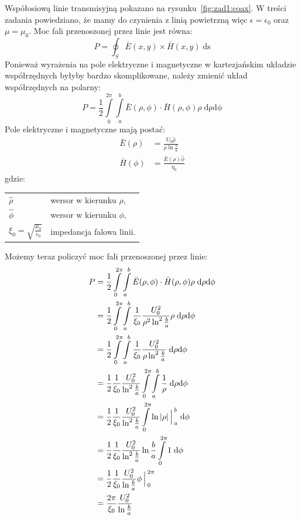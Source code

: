 \documentclass[rep.tex]{subfiles}
\begin{document}
Współosiową linie transmisyjną pokazano na rysunku~\ref{fig:zad1:coax}.
W treści zadania powiedziano, że mamy do czynienia z linią powietrzną więc $\epsilon = \epsilon_0$ oraz $\mu = \mu_0$.
Moc fali przenoszonej przez linie jest równa:
\begin{equation}
  P = \oint_S\bar{E}(x, y) \times \bar{H}(x, y) \; \mathrm{ds}
\end{equation}
Ponieważ wyrażenia na pole elektryczne i magnetyczne w kartezjańskim układzie współrzędnych byłyby bardzo skomplikowane,
należy zmienić układ współrzędnych na polarny:
\begin{equation}
  P = \frac{1}{2} \int\limits_0^{2\pi}\int\limits_a^b \bar{E}(\rho, \phi) \cdot \bar{H}(\rho, \phi) \rho \; \mathrm{d\rho} \mathrm{d\phi}
\end{equation}
Pole elektryczne i magnetyczne mają postać:
\begin{align}
  \bar{E}(\rho)    & = \frac{U_0\hat{\rho}}{\rho \ln \frac{b}{a}} \\
  \bar{H}(\phi) & = \frac{\bar{E}(\rho)\hat{\phi}}{\eta_0}
\end{align}
gdzie: \\
\begin{tabular}{l @{ - } l}
  $\hat{\rho}$ & wersor w kierunku $\rho$, \\
  $\hat{\phi}$ & wersor w kierunku $\phi$, \\
  $\xi_0 = \sqrt{\frac{\mu_0}{\epsilon_0}}$ & impedancja falowa linii. \\
\end{tabular}

Możemy teraz policzyć moc fali przenoszonej przez linie:
\begin{align}
  P & =  \frac{1}{2} \int\limits_0^{2\pi}\int\limits_a^b \bar{E}(\rho, \phi) \cdot \bar{H}(\rho, \phi) \rho \; \mathrm{d\rho} \mathrm{d\phi} \nonumber \\
    & =  \frac{1}{2} \int\limits_0^{2\pi}\int\limits_a^b \frac{1}{\xi_0}\frac{U_0^2}{\rho^2\ln^2\frac{b}{a}} \rho \; \mathrm{d\rho} \mathrm{d\phi} \nonumber \\
    & =  \frac{1}{2} \int\limits_0^{2\pi}\int\limits_a^b \frac{1}{\xi_0}\frac{U_0^2}{\rho\ln^2\frac{b}{a}} \; \mathrm{d\rho} \mathrm{d\phi} \nonumber \\
    & =  \frac{1}{2} \frac{1}{\xi_0}\frac{U_0^2}{\ln^2\frac{b}{a}} \int\limits_0^{2\pi}\int\limits_a^b \frac{1}{\rho} \; \mathrm{d\rho} \mathrm{d\phi} \nonumber \\
    & =  \frac{1}{2} \frac{1}{\xi_0}\frac{U_0^2}{\ln^2\frac{b}{a}} \int\limits_0^{2\pi} \ln|\rho|\Big\arrowvert_a^b \; \mathrm{d\phi} \nonumber \\
    & =  \frac{1}{2} \frac{1}{\xi_0}\frac{U_0^2}{\ln^2\frac{b}{a}} \ln\frac{b}{a} \int\limits_0^{2\pi} 1 \; \mathrm{d\phi} \nonumber \\
    & =  \frac{1}{2} \frac{1}{\xi_0}\frac{U_0^2}{\ln\frac{b}{a}} \phi\Big\arrowvert_0^{2\pi} \nonumber \\
    & =  \frac{2\pi}{\xi_0}\frac{U_0^2}{\ln\frac{b}{a}} \label{eqn:zad1:power}
\end{align}
\end{document}
